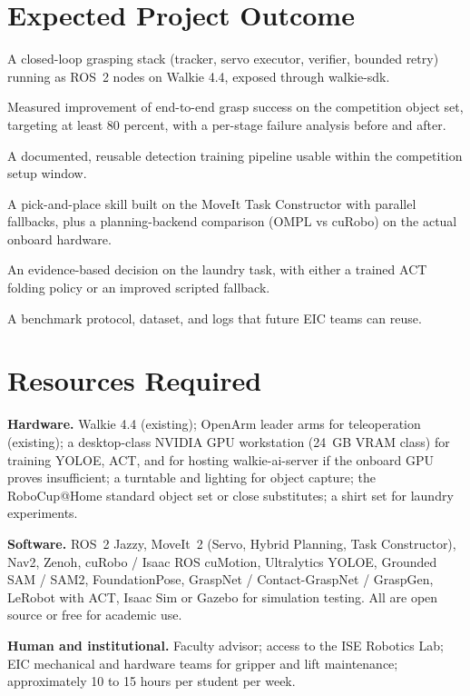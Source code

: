 \documentclass[12pt,a4paper]{article}
\begin{document}
\section*{Expected Project Outcome}

A closed-loop grasping stack (tracker, servo executor, verifier, bounded retry) running as ROS~2
nodes on Walkie 4.4, exposed through walkie-sdk.

Measured improvement of end-to-end grasp success on the competition object set, targeting at
least 80 percent, with a per-stage failure analysis before and after.

A documented, reusable detection training pipeline usable within the competition setup
window.

A pick-and-place skill built on the MoveIt Task Constructor with parallel fallbacks, plus a
planning-backend comparison (OMPL vs cuRobo) on the actual onboard hardware.

An evidence-based decision on the laundry task, with either a trained ACT folding policy or an
improved scripted fallback.

A benchmark protocol, dataset, and logs that future EIC teams can reuse.

\section*{Resources Required}

\textbf{Hardware.} Walkie 4.4 (existing); OpenArm leader arms for teleoperation (existing); a
desktop-class NVIDIA GPU workstation (24~GB VRAM class) for training YOLOE, ACT, and for
hosting walkie-ai-server if the onboard GPU proves insufficient; a turntable and lighting for
object capture; the RoboCup@Home standard object set or close substitutes; a shirt set for
laundry experiments.

\textbf{Software.} ROS~2 Jazzy, MoveIt~2 (Servo, Hybrid Planning, Task Constructor), Nav2, Zenoh,
cuRobo / Isaac ROS cuMotion, Ultralytics YOLOE, Grounded SAM / SAM2, FoundationPose,
GraspNet / Contact-GraspNet / GraspGen, LeRobot with ACT, Isaac Sim or Gazebo for simulation
testing. All are open source or free for academic use.

\textbf{Human and institutional.} Faculty advisor; access to the ISE Robotics Lab; EIC mechanical and
hardware teams for gripper and lift maintenance; approximately 10 to 15 hours per student per
week.
\end{document}
